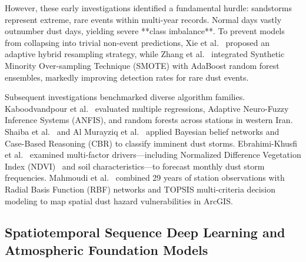 However, these early investigations identified a fundamental hurdle: sandstorms represent extreme, rare events within multi-year records. Normal days vastly outnumber dust days, yielding severe **class imbalance**. To prevent models from collapsing into trivial non-event predictions, Xie et al.~\cite{ref5} proposed an adaptive hybrid resampling strategy, while Zhang et al.~\cite{ref6} integrated Synthetic Minority Over-sampling Technique (SMOTE) with AdaBoost random forest ensembles, markedly improving detection rates for rare dust events.

Subsequent investigations benchmarked diverse algorithm families. Kaboodvandpour et al.~\cite{ref7} evaluated multiple regressions, Adaptive Neuro-Fuzzy Inference Systems (ANFIS), and random forests across stations in western Iran. Shaiba et al.~\cite{ref9} and Al Murayziq et al.~\cite{ref8} applied Bayesian belief networks and Case-Based Reasoning (CBR) to classify imminent dust storms. Ebrahimi-Khusfi et al.~\cite{ref13} examined multi-factor drivers—including Normalized Difference Vegetation Index (NDVI)~\cite{ref14} and soil characteristics—to forecast monthly dust storm frequencies. Mahmoudi et al.~\cite{ref15} combined 29 years of station observations with Radial Basis Function (RBF) networks and TOPSIS multi-criteria decision modeling to map spatial dust hazard vulnerabilities in ArcGIS.

\subsection{Spatiotemporal Sequence Deep Learning and Atmospheric Foundation Models}
\label{subsec:deep_spatiotemporal}

